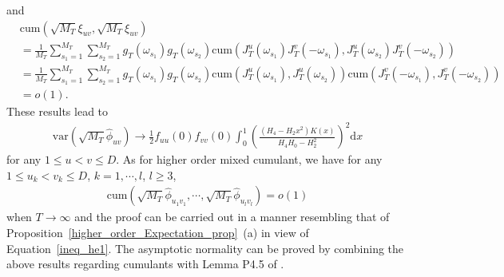 \documentclass[11pt]{article}
\numberwithin{equation}{section}
\theoremstyle{plain}
\theoremstyle{definition}
\theoremstyle{definition}
\theoremstyle{assumption}
\theoremstyle{proposition}
\theoremstyle{proposition}
\theoremstyle{example}
\theoremstyle{lemma}
\theoremstyle{theorem}
\theoremstyle{remark}
\begin{document}
and
\begin{align*}
&\mathrm{cum}(\sqrt{M_T}\xi_{uv}, \sqrt{M_T}\xi_{uv}) \\
&= \frac{1}{M_T}\sum_{s_1=1}^{M_T}\sum_{s_2=1}^{M_T}g_T(\omega_{s_1})g_T(\omega_{s_2})\mathrm{cum}(J_{T}^{u}(\omega_{s_1})J_{T}^{v}(-\omega_{s_1}), J_{T}^{u}(\omega_{s_2})J_{T}^{v}(-\omega_{s_2})) \\
&= \frac{1}{M_T}\sum_{s_1=1}^{M_T}\sum_{s_2=1}^{M_T}g_T(\omega_{s_1})g_T(\omega_{s_2})\mathrm{cum}(J_{T}^{u}(\omega_{s_1}), J_{T}^{u}(\omega_{s_2}))\mathrm{cum}(J_{T}^{v}(-\omega_{s_1}), J_{T}^{v}(-\omega_{s_2})) \\
&=o(1) .
\end{align*}
These results lead to 
\begin{align*}
\mathrm{var}(\sqrt{M_T}\hat{\phi}_{uv})
\rightarrow \frac{1}{2}f_{uu}(0)f_{vv}(0)\int_{0}^{1} \left(\frac{(H_4 - H_2 x^2)K(x)}{H_4H_0 - H_2^2}\right)^2\mathrm{d}x 
\end{align*}
for any $1\leqslant u<v\leqslant D$. As for higher order mixed cumulant, we have for any $1\leqslant u_k<v_k\leqslant D$, $k=1,\cdots,l$, $l\geqslant3$,
\begin{align*}
\mathrm{cum}(\sqrt{M_T}\hat{\phi}_{u_1v_1},\cdots,\sqrt{M_T}\hat{\phi}_{u_lv_l}) = o(1)
\end{align*}
when $T\rightarrow\infty$ and the proof can be carried out in a manner resembling that of Proposition~\ref{higher_order_Expectation_prop}~(a) in view of Equation~\eqref{ineq_he1}. The asymptotic normality can be proved by combining the above results regarding cumulants with Lemma P4.5 of \citet{Brillinger2001}.
\end{document}
